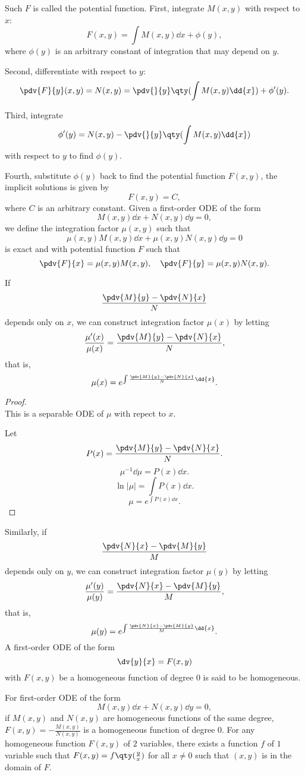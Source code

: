 \documentclass[a4paper,12pt]{report}
\begin{document}
Such $F$ is called the potential function.
First, integrate $M(x,y)$ with respect to $x$:
\[F(x,y)=\int M(x,y)\dd{x}+\phi(y),\]
where $\phi(y)$ is an arbitrary constant of integration that may depend on $y$.

Second, differentiate with respect to $y$:
\[\pdv{F}{y}(x,y)=N(x,y)=\pdv{}{y}\qty(\int M(x,y)\dd{x})+\phi'(y).\]

Third, integrate
\[\phi'(y)=N(x,y)-\pdv{}{y}\qty(\int M(x,y)\dd{x})\]
with respect to $y$ to find $\phi(y)$.

Fourth, substitute $\phi(y)$ back to find the potential function $F(x,y)$, the implicit solutions is given by
\[F(x,y)=C,\]
where $C$ is an arbitrary constant.
Given a first-order ODE of the form
\[M(x,y)\dd{x}+N(x,y)\dd{y}=0,\]
we define the integration factor $\mu(x,y)$ such that
\[\mu(x,y)M(x,y)\dd{x}+\mu(x,y)N(x,y)\dd{y}=0\]
is exact and with potential function $F$ such that
\[\pdv{F}{x}=\mu(x,y)M(x,y),\quad\pdv{F}{y}=\mu(x,y)N(x,y).\]

If
\[\frac{\pdv{M}{y}-\pdv{N}{x}}{N}\]
depends only on $x$, we can construct integration factor $\mu(x)$ by letting
\[\frac{\mu'(x)}{\mu(x)}=\frac{\pdv{M}{y}-\pdv{N}{x}}{N},\]
that is,
\[\mu(x)=e^{\int\frac{\pdv{M}{y}-\pdv{N}{x}}{N}\dd{x}}.\]
\begin{proof}\mbox{}\\
This is a separable ODE of $\mu$ with repect to $x$.

Let
\[P(x)=\frac{\pdv{M}{y}-\pdv{N}{x}}{N}.\]
\[\mu^{-1}\dd{\mu}=P(x)\dd{x}.\]
\[\ln|\mu|=\int P(x)\dd{x}.\]
\[\mu=e^{\int P(x)\dd{x}}.\]
\end{proof}

Similarly, if
\[\frac{\pdv{N}{x}-\pdv{M}{y}}{M}\]
depends only on $y$, we can construct integration factor $\mu(y)$ by letting
\[\frac{\mu'(y)}{\mu(y)}=\frac{\pdv{N}{x}-\pdv{M}{y}}{M},\]
that is,
\[\mu(y)=e^{\int\frac{\pdv{N}{x}-\pdv{M}{y}}{M}\dd{x}}.\]
A first-order ODE of the form
\[\dv{y}{x}=F(x,y)\]
with $F(x,y)$ be a homogeneous function of degree $0$ is said to be homogeneous. 

For first-order ODE of the form
\[M(x,y)\dd{x}+N(x,y)\dd{y}=0,\]
if $M(x,y)$ and $N(x,y)$ are homogeneous functions of the same degree, $F(x,y)=-\frac{M(x,y)}{N(x,y)}$ is a homogeneous function of degree $0$.
For any homogeneous function $F(x,y)$ of $2$ variables, there exists a function $f$ of $1$ variable such that $F(x,y)=f\qty(\frac{y}{x})$ for all $x\neq 0$ such that $(x,y)$ is in the domain of $F$.
\end{document}
